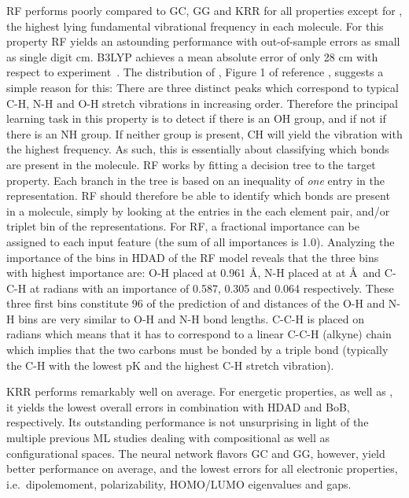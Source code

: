 \documentclass[reprint, superscriptaddress,
amsmath,amssymb, aps, prb,
]{revtex4-1}
\begin{document}
{RF performs poorly compared to GC, GG and KRR for all properties except for , the highest lying fundamental vibrational frequency in each molecule. 
For this property RF yields an astounding performance with out-of-sample errors as small as single digit cm. 
B3LYP achieves a mean absolute error of only 28 cm with respect to experiment~\cite{AngelaVibrationDFTerror2004}. 
The distribution of , Figure 1 of reference \cite{sk}, suggests a simple reason for this: 
There are three distinct peaks which correspond to typical C-H, N-H and O-H stretch vibrations in increasing order. 
Therefore the principal learning task in this property is to detect if there is an OH group, and if not if there is an NH group. 
If neither group is present, CH will yield the vibration with the highest frequency. 
As such, this is essentially about classifying which bonds are present in the molecule.
RF works by fitting a decision tree to the target property. 
Each branch in the tree is based on an inequality of \emph{one} entry in the representation. 
RF should therefore be able to identify which bonds are present in a molecule, simply by looking 
at the entries in the each element pair, and/or triplet bin of the representations. 
For RF, a fractional importance can be assigned to each input feature (the sum of all importances is 1.0). 
Analyzing the importance of the bins in HDAD of the RF model reveals that the three bins with highest importance are: O-H placed at 0.961 \AA, N-H placed at at  \AA\, and C-C-H at  radians with an importance of 0.587, 0.305 and 0.064 respectively. 
These three first bins constitute  96 of the prediction of  and distances of the O-H and N-H bins are very similar to O-H and N-H bond lengths. 
C-C-H is placed on  radians which means that it has to correspond to a linear C-C-H (alkyne) chain which implies that the two carbons must be bonded by a triple bond (typically the C-H with the lowest pK and the highest C-H stretch vibration). 


KRR performs remarkably well on average. For energetic properties, as well as , it yields the lowest overall errors in combination with HDAD and BoB, respectively. 
Its outstanding performance is not unsurprising in light of the multiple previous ML studies dealing with compositional as well as configurational spaces. 
The neural network flavors GC and GG, however, yield better performance on average, and the lowest errors for 
all electronic properties, i.e.~dipolemoment, polarizability, HOMO/LUMO eigenvalues and gaps. 


}
\end{document}
